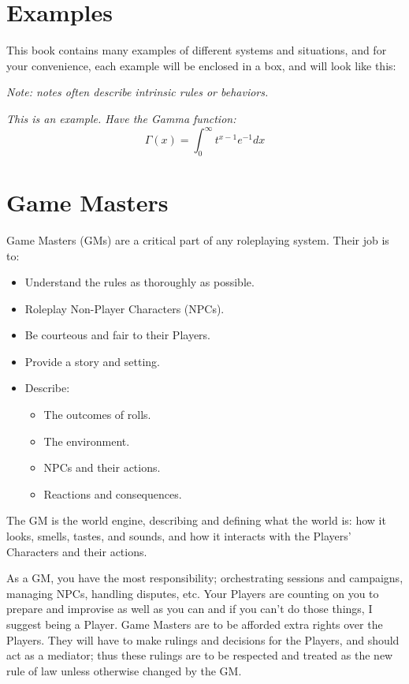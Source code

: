\documentclass[../main.tex]{subfiles}
\begin{document}
    \section{Examples}

    This book contains many examples of different systems and situations, and for your convenience, each example will be enclosed in a box, and will look like this:
    
    \emph{Note: notes often describe intrinsic rules or behaviors.}
    \begin{mdframed}[style=Arrata]
        \emph{This is an example. Have the Gamma function:}
        \begin{equation*}
            \Gamma(x) = \int_{0}^{\infty}t^{x-1}e^{-1}dx
        \end{equation*}
    \end{mdframed}

    \section{Game Masters}

    Game Masters (GMs) are a critical part of any roleplaying system. Their job is to:

    \begin{itemize}
        \item Understand the rules as thoroughly as possible.
        \item Roleplay Non-Player Characters (NPCs).
        \item Be courteous and fair to their Players.
        \item Provide a story and setting.
        \item Describe:
        \begin{itemize}
            \item The outcomes of rolls.
            \item The environment.
            \item NPCs and their actions.
            \item Reactions and consequences.
        \end{itemize}
    \end{itemize}
    
    The GM is the world engine, describing and defining what the world is: how it looks, smells, tastes, and sounds, and how it interacts with the Players' Characters and their actions.
    
    As a GM, you have the most responsibility; orchestrating sessions and campaigns, managing NPCs, handling disputes, etc. Your Players are counting on you to prepare and improvise as well as you can and if you can't do those things, I suggest being a Player.
    Game Masters are to be afforded extra rights over the Players. They will have to make rulings and decisions for the Players, and should act as a mediator; thus these rulings are to be respected and treated as the new rule of law unless otherwise changed by the GM.
\end{document}
